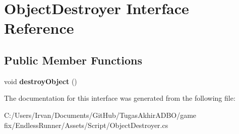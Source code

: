 \hypertarget{interface_object_destroyer}{}\section{Object\+Destroyer Interface Reference}
\label{interface_object_destroyer}
\subsection*{Public Member Functions}
\begin{DoxyCompactItemize}
\item 
\hypertarget{interface_object_destroyer_a9d672c8702f777f3246142f28468b880}{}\label{interface_object_destroyer_a9d672c8702f777f3246142f28468b880} 
void {\bfseries destroy\+Object} ()
\end{DoxyCompactItemize}


The documentation for this interface was generated from the following file\+:\begin{DoxyCompactItemize}
\item 
C\+:/\+Users/\+Irvan/\+Documents/\+Git\+Hub/\+Tugas\+Akhir\+A\+D\+B\+O/game fix/\+Endless\+Runner/\+Assets/\+Script/Object\+Destroyer.\+cs\end{DoxyCompactItemize}
